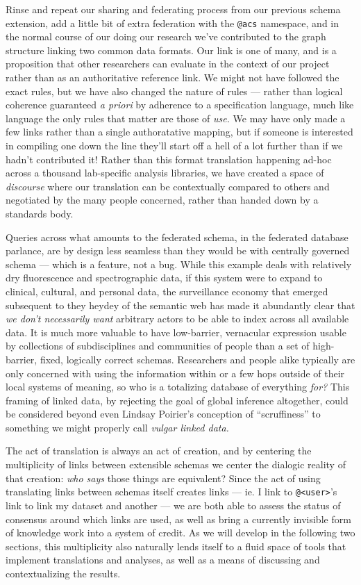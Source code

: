 Rinse and repeat our sharing and federating process from our previous
schema extension, add a little bit of extra federation with the
\texttt{@acs} namespace, and in the normal course of our doing our
research we've contributed to the graph structure linking two common
data formats. Our link is one of many, and is a proposition that other
researchers can evaluate in the context of our project rather than as an
authoritative reference link. We might not have followed the exact
rules, but we have also changed the nature of rules --- rather than
logical coherence guaranteed \emph{a priori} by adherence to a
specification language, much like language the only rules that matter
are those of \emph{use.} We may have only made a few links rather than a
single authoratative mapping, but if someone is interested in compiling
one down the line they'll start off a hell of a lot further than if we
hadn't contributed it! Rather than this format translation happening
ad-hoc across a thousand lab-specific analysis libraries, we have
created a space of \emph{discourse} where our translation can be
contextually compared to others and negotiated by the many people
concerned, rather than handed down by a standards body.

Queries across what amounts to the federated schema, in the federated
database parlance, are by design less seamless than they would be with
centrally governed schema --- which is a feature, not a bug. While this
example deals with relatively dry fluorescence and spectrographic data,
if this system were to expand to clinical, cultural, and personal data,
the surveillance economy that emerged subsequent to they heydey of the
semantic web has made it abundantly clear that \emph{we don't
necessarily want} arbitrary actors to be able to index across all
available data. It is much more valuable to have low-barrier, vernacular
expression usable by collections of subdisciplines and communities of
people than a set of high-barrier, fixed, logically correct schemas.
Researchers and people alike typically are only concerned with using the
information within or a few hops outside of their local systems of
meaning, so who is a totalizing database of everything \emph{for?} This
framing of linked data, by rejecting the goal of global inference
altogether, could be considered beyond even Lindsay Poirier's conception
of ``scruffiness'' to something we might properly call \emph{vulgar
linked data.}

The act of translation is always an act of creation, and by centering
the multiplicity of links between extensible schemas we center the
dialogic reality of that creation: \emph{who says} those things are
equivalent? Since the act of using translating links between schemas
itself creates links --- ie. I link to
\texttt{@\textless{}user\textgreater{}}'s link to link my dataset and
another --- we are both able to assess the status of consensus around
which links are used, as well as bring a currently invisible form of
knowledge work into a system of credit. As we will develop in the
following two sections, this multiplicity also naturally lends itself to
a fluid space of tools that implement translations and analyses, as well
as a means of discussing and contextualizing the results.

